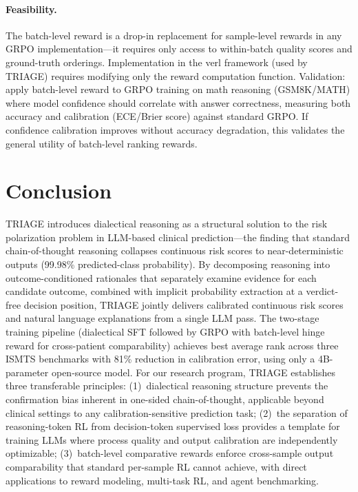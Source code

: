 \documentclass[11pt,a4paper]{article}
\begin{document}
\paragraph{Feasibility.} The batch-level reward is a drop-in replacement for sample-level rewards in any GRPO implementation---it requires only access to within-batch quality scores and ground-truth orderings. Implementation in the verl framework (used by TRIAGE) requires modifying only the reward computation function. Validation: apply batch-level reward to GRPO training on math reasoning (GSM8K/MATH) where model confidence should correlate with answer correctness, measuring both accuracy and calibration (ECE/Brier score) against standard GRPO. If confidence calibration improves without accuracy degradation, this validates the general utility of batch-level ranking rewards.

\section{Conclusion}

TRIAGE introduces dialectical reasoning as a structural solution to the risk polarization problem in LLM-based clinical prediction---the finding that standard chain-of-thought reasoning collapses continuous risk scores to near-deterministic outputs (99.98\% predicted-class probability). By decomposing reasoning into outcome-conditioned rationales that separately examine evidence for each candidate outcome, combined with implicit probability extraction at a verdict-free decision position, TRIAGE jointly delivers calibrated continuous risk scores and natural language explanations from a single LLM pass. The two-stage training pipeline (dialectical SFT followed by GRPO with batch-level hinge reward for cross-patient comparability) achieves best average rank across three ISMTS benchmarks with 81\% reduction in calibration error, using only a 4B-parameter open-source model. For our research program, TRIAGE establishes three transferable principles: (1)~dialectical reasoning structure prevents the confirmation bias inherent in one-sided chain-of-thought, applicable beyond clinical settings to any calibration-sensitive prediction task; (2)~the separation of reasoning-token RL from decision-token supervised loss provides a template for training LLMs where process quality and output calibration are independently optimizable; (3)~batch-level comparative rewards enforce cross-sample output comparability that standard per-sample RL cannot achieve, with direct applications to reward modeling, multi-task RL, and agent benchmarking.
\end{document}
